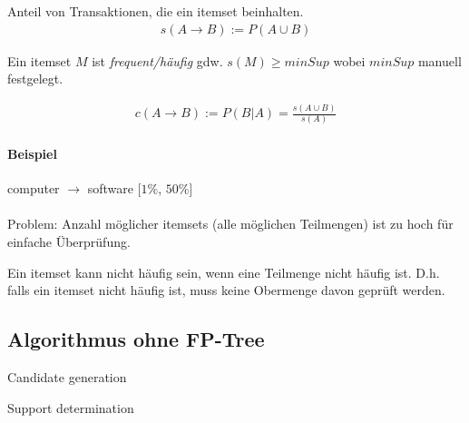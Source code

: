 \documentclass[10pt]{article} %
\begin{document}
\begin{definition}[Support] 
      Anteil von Transaktionen, die ein itemset beinhalten.
      \begin{align*} 
          s(A \rightarrow B) := P(A \cup B)
      \end{align*} 
\end{definition} 

\begin{definition} Ein itemset $M$ ist
  \textit{frequent/häufig} gdw. $s(M) \geq \mathit{minSup}$ wobei
  $\mathit{minSup}$ manuell festgelegt.
\end{definition} 


\begin{definition}[Confidence] 
     \begin{align*} 
          c(A \rightarrow B) := P(B | A) = \frac{s(A \cup B)}{s(A)}
      \end{align*}  
\end{definition} 

\paragraph{Beispiel} 
computer $\rightarrow$ software [$1\%$, $50\%$] \\
 \\

Problem: Anzahl möglicher itemsets (alle möglichen Teilmengen) ist zu hoch für
einfache Überprüfung.

\begin{definition} 
  Ein itemset kann nicht häufig sein, wenn eine Teilmenge nicht häufig ist. D.h.
  falls ein itemset nicht häufig ist, muss keine Obermenge davon geprüft werden.
\end{definition} 

\subsection{Algorithmus ohne FP-Tree}
\begin{cptenumerate}
\item Candidate generation
  \item Support determination
\end{cptenumerate}
\end{document}

